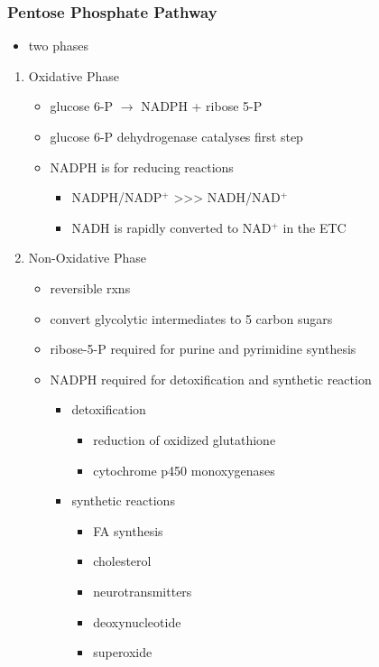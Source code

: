 \documentclass{scrartcl}
\begin{document}
\subsubsection{Pentose Phosphate Pathway}
\label{sec:org6b57610}
\begin{itemize}
\item two phases
\end{itemize}
\begin{enumerate}
\item Oxidative Phase
\label{sec:org1177744}
\begin{itemize}
\item glucose 6-P \(\to\) NADPH + ribose 5-P
\item glucose 6-P dehydrogenase catalyses first step
\item NADPH is for reducing reactions
\begin{itemize}
\item NADPH/NADP\(^{\text{+}}\) \textgreater{}\textgreater{}\textgreater{} NADH/NAD\(^{\text{+}}\)
\item NADH is rapidly converted to NAD\(^{\text{+}}\) in the ETC
\end{itemize}
\end{itemize}
\item Non-Oxidative Phase
\label{sec:orgbc81167}
\begin{itemize}
\item reversible rxns
\item convert glycolytic intermediates to 5 carbon sugars

\item ribose-5-P required for purine and pyrimidine synthesis
\item NADPH required for detoxification and synthetic reaction
\begin{itemize}
\item detoxification
\begin{itemize}
\item reduction of oxidized glutathione
\item cytochrome p450 monoxygenases
\end{itemize}
\item synthetic reactions
\begin{itemize}
\item FA synthesis
\item cholesterol
\item neurotransmitters
\item deoxynucleotide
\item superoxide
\end{itemize}
\end{itemize}
\end{itemize}
\end{enumerate}
\end{document}
